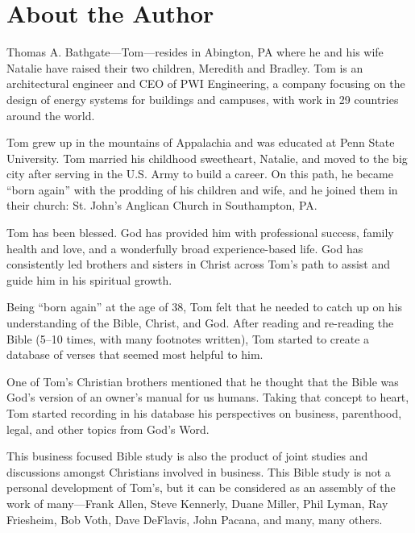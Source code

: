 \documentclass[12pt]{memoir}
\begin{document}



\cleardoublepage

\chapter{About the Author}

Thomas A. Bathgate---Tom---resides in Abington, PA where he and his wife Natalie have raised their two children, Meredith and Bradley. Tom is an architectural engineer and CEO of PWI Engineering, a company focusing on the design of energy systems for buildings and campuses, with work in 29 countries around the world.

Tom grew up in the mountains of Appalachia and was educated at Penn State University. Tom married his childhood sweetheart, Natalie, and moved to the big city after serving in the U.S. Army to build a career. On this path, he became ``born again'' with the prodding of his children and wife, and he joined them in their church: St. John's Anglican Church in Southampton, PA.

Tom has been blessed. God has provided him with professional success, family health and love, and a wonderfully broad experience-based life. God has consistently led brothers and sisters in Christ across Tom's path to assist and guide him in his spiritual growth.

Being ``born again'' at the age of 38, Tom felt that he needed to catch up on his understanding of the Bible, Christ, and God. After reading and re-reading the Bible (5--10 times, with many footnotes written), Tom started to create a database of verses that seemed most helpful to him.

One of Tom's Christian brothers mentioned that he thought that the Bible was God's version of an owner's manual for us humans. Taking that concept to heart, Tom started recording in his database his perspectives on business, parenthood, legal, and other topics from God's Word.

This business focused Bible study is also the product of joint studies and discussions amongst Christians involved in business. This Bible study is not a personal development of Tom's, but it can be considered as an assembly of the work of many---Frank Allen, Steve Kennerly, Duane Miller, Phil Lyman, Ray Friesheim, Bob Voth, Dave DeFlavis, John Pacana, and many, many others.  
\end{document}
